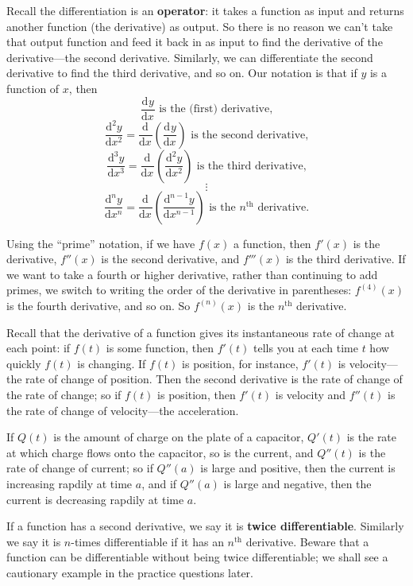 \documentclass{article}
\newcommand{\deriv}[3][]{\frac{\mathrm{d}^{#1} #2}{\mathrm{d}#3^{#1}}}
\begin{document}
Recall the differentiation is an \textbf{operator}: it takes a function as input and returns another function (the derivative) as output. So there is no reason we can't take that output function and feed it back in as input to find the derivative of the derivative---the second derivative. Similarly, we can differentiate the second derivative to find the third derivative, and so on. Our notation is that if $y$ is a function of $x$, then
\[\deriv{y}{x}\mbox{   is the (first) derivative,}\]
\[\deriv[2]{y}{x}=\deriv{}{x}\left(\deriv{y}{x}\right)\mbox{   is the second derivative,}\]
\[\deriv[3]{y}{x}=\deriv{}{x}\left(\deriv[2]{y}{x}\right)\mbox{   is the third derivative,}\]
\[\vdots\]
\[\deriv[n]{y}{x}=\deriv{}{x}\left(\deriv[n-1]{y}{x}\right)\mbox{   is the $n^\mathrm{th}$ derivative.}\]

Using the ``prime'' notation, if we have $f(x)$ a function, then $f'(x)$ is the derivative, $f''(x)$ is the second derivative, and $f'''(x)$ is the third derivative. If we want to take a fourth or higher derivative, rather than continuing to add primes, we switch to writing the order of the derivative in parentheses:  $f^{(4)}(x)$ is the fourth derivative, and so on. So $f^{(n)}(x)$ is the $n^\mathrm{th}$ derivative.\bigskip



Recall that the derivative of a function gives its instantaneous rate of change at each point: if $f(t)$ is some function, then $f'(t)$ tells you at each time $t$ how quickly $f(t)$ is changing. If $f(t)$ is position, for instance, $f'(t)$ is velocity---the rate of change of position. Then the second derivative is the rate of change of the rate of change; so if $f(t)$ is position, then $f'(t)$ is velocity and $f''(t)$ is the rate of change of velocity---the acceleration.

If $Q(t)$ is the amount of charge on the plate of a capacitor, $Q'(t)$ is the rate at which charge flows onto the capacitor, so is the current, and $Q''(t)$ is the rate of change of current; so if $Q''(a)$ is large and positive, then the current is increasing rapdily at time $a$, and if $Q''(a)$ is large and negative, then the current is decreasing rapdily at time $a$.\bigskip


If a function has a second derivative, we say it is \textbf{twice differentiable}. Similarly we say it is $n$-times differentiable if it has an $n^\mathrm{th}$ derivative. Beware that a function can be differentiable without being twice differentiable; we shall see a cautionary example in the practice questions later.
\end{document}
